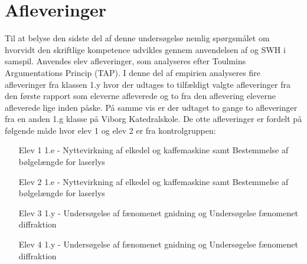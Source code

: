 \section{Afleveringer}
\label{sec:afv}
Til at belyse den sidste del af denne undersøgelse nemlig spørgsmålet om hvorvidt den skriftlige kompetence udvikles gennem anvendelsen af \ib{} og SWH i samspil. Anvendes elev afleveringer, som analyseres efter Toulmins Argumentations Princip (TAP). I denne del af empirien analyseres fire afleveringer fra klassen 1.y hvor der udtages to tilfældigt valgte afleveringer fra den første rapport som eleverne afleverede og to fra den aflevering eleverne afleverede lige inden påske. På samme vis er der udtaget to gange to afleveringer fra en anden 1.g klasse på Viborg Katedralskole.
De otte afleveringer er fordelt på følgende måde hvor elev 1 og elev 2 er fra kontrolgruppen: 
\begin{enumerate}
	\item[Elev 1] 1.e - Nyttevirkning af elkedel og kaffemaskine samt Bestemmelse af bølgelængde for laserlys\vspace{-15pt}
	\item[Elev 2] 1.e - Nyttevirkning af elkedel og kaffemaskine samt Bestemmelse af bølgelængde for laserlys\vspace{-15pt}
	\item[Elev 3] 1.y - Undersøgelse af fænomenet gnidning og Undersøgelse fænomenet diffraktion\vspace{-15pt}
	\item[Elev 4] 1.y - Undersøgelse af fænomenet gnidning og Undersøgelse fænomenet diffraktion
\end{enumerate}

